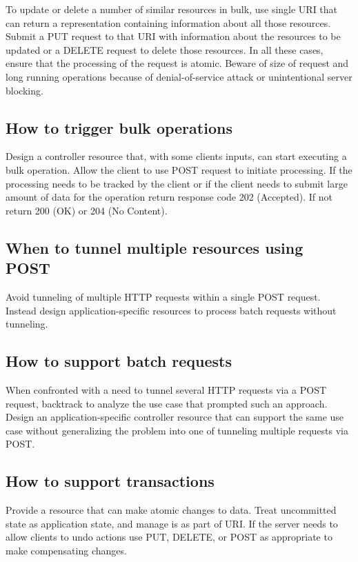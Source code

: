 \documentclass[11pt,a4paper]{article}
\begin{document}
To update or delete a number of similar resources in bulk, use single URI that can return a representation containing information about all those resources. Submit a PUT request to that URI with information about the resources to be updated or a DELETE request to delete those resources. In all these cases, ensure that the processing of the request is atomic. Beware of size of request and long running operations because of denial-of-service attack or unintentional server blocking.

\subsection{How to trigger bulk operations}
Design a controller resource that, with some clients inputs, can start executing a bulk operation. Allow the client to use POST request to initiate processing. If the processing needs to be tracked by the client or if the client needs to submit large amount of data for the operation return response code 202 (Accepted). If not return 200 (OK) or 204 (No Content).

\subsection{When to tunnel multiple resources using POST}
Avoid tunneling of multiple HTTP requests within a single POST request. Instead design application-specific resources to process batch requests without tunneling.

\subsection{How to support batch requests}
When confronted with a need to tunnel several HTTP requests via a POST request, backtrack to analyze the use case that prompted such an approach. Design an application-specific controller resource that can support the same use case without generalizing the problem into one of tunneling multiple requests via POST.

\subsection{How to support transactions}
Provide a resource that can make atomic changes to data. Treat uncommitted state as application state, and manage is as part of URI. If the server needs to allow clients to undo actions use PUT, DELETE, or POST as appropriate to make compensating changes.
\end{document}
